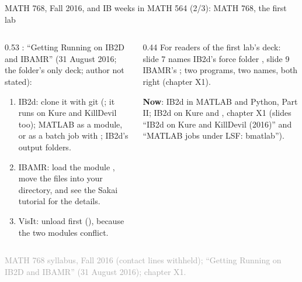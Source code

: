 \documentclass[aspectratio=169,11pt]{beamer}
\newcommand{\sourcecredit}[1]{\vfill\begin{flushright}\tiny\textcolor{DarkGray}{#1}\end{flushright}}
\begin{document}
\begin{frame}{MATH 768, Fall 2016, and IB weeks in MATH 564 (2/3): MATH 768, the first lab}
\label{fr:m768lab}
\begin{columns}[T,onlytextwidth]
\begin{column}{0.53\textwidth}
\footnotesize
{}: ``Getting Running on IB2D and IBAMR'' (31 August 2016; the folder's only deck; author not stated):
\begin{enumerate}\setlength{\itemsep}{1pt}
  \item IB2d: clone it with git (; it runs on Kure and KillDevil too); MATLAB as a module, or as a batch job with ; IB2d's output folders.
  \item IBAMR: load the module , move the files into your  directory, and see the Sakai tutorial for the details.
  \item VisIt: unload  first (), because the two modules conflict.
\end{enumerate}
\end{column}
\begin{column}{0.44\textwidth}
\footnotesize
For readers of the first lab's deck: slide 7 names IB2d's force folder , slide 9 IBAMR's ; two programs, two names, both right (chapter X1).

\vspace{2mm}
\begin{punchbox}
\scriptsize \textbf{Now}: IB2d in MATLAB and Python, Part II; IB2d on Kure and , chapter X1 (slides ``IB2d on Kure and KillDevil (2016)'' and ``MATLAB jobs under LSF: bmatlab'').
\end{punchbox}
\end{column}
\end{columns}
\sourcecredit{MATH 768 syllabus, Fall 2016 (contact lines withheld); ``Getting Running on IB2D and IBAMR'' (31 August 2016); chapter X1.}
\end{frame}
\end{document}
